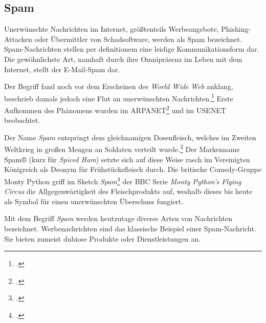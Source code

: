 \subsection{Spam} %
\label{sub:spam}
Unerwünschte Nachrichten im Internet, größtenteils Werbeangebote,
Phishing-Attacken oder Übermittler von Schadsoftware, werden als Spam
bezeichnet. Spam-Nachrichten stellen per definitionem eine leidige
Kommunikationsform dar. Die gewöhnlichste Art, namhaft durch ihre Omnipräsenz
im Leben mit dem Internet, stellt der E-Mail-Spam dar.

Der Begriff fand noch vor dem Erscheinen des \emph{World Wide Web} anklang,
beschrieb damals jedoch eine Flut an unerwünschten
Nachrichten.\footcite{originTermSpam} Erste Aufkommen des Phänomens wurden im
ARPANET\footcite{junkMailProblem} und im USENET beobachtet.

Der Name \emph{Spam} entspringt dem gleichnamigen Dosenfleisch, welches im
Zweiten Weltkrieg in großen Mengen an Soldaten verteilt
wurde.\footcite{lifeDuringSecondWW} Der Markenname Spam® (kurz für \emph{Spiced
Ham}) setzte sich auf diese Weise rasch im Vereinigten Königreich als Deonym
für Frühstücksfleisch durch. Die britische Comedy-Gruppe Monty Python griff im
Sketch \emph{Spam}\footcite{spamMontyPython} der BBC Serie \emph{Monty Python’s
Flying Circus} die Allgegenwärtigkeit des Fleischprodukts auf, weshalb dieses
bis heute als Symbol für einen unerwünschten Überschuss fungiert.

Mit dem Begriff \emph{Spam} werden heutzutage diverse Arten von Nachrichten
bezeichnet. Werbenachrichten sind das klassische Beispiel einer Spam-Nachricht.
Sie bieten zumeist dubiose Produkte oder Dienstleistungen an.
